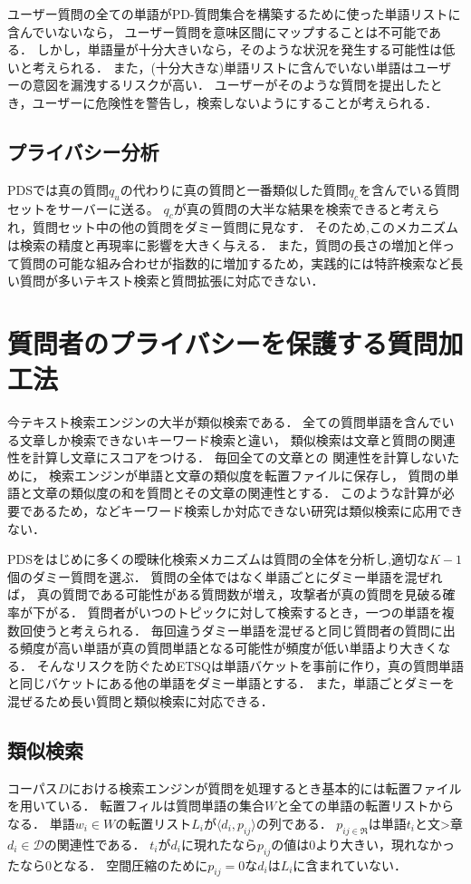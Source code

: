 \documentclass[master]{suribt}
\theoremstyle{definition}
\begin{document}
 ユーザー質問の全ての単語がPD-質問集合を構築するために使った単語リストに含んでいないなら，
 ユーザー質問を意味区間にマップすることは不可能である．
 しかし，単語量が十分大きいなら，そのような状況を発生する可能性は低いと考えられる．
 また，(十分大きな)単語リストに含んでいない単語はユーザーの意図を漏洩するリスクが高い．
 ユーザーがそのような質問を提出したとき，ユーザーに危険性を警告し，検索しないようにすることが考えられる．

 \subsection{プライバシー分析}
 PDSでは真の質問$q_u$の代わりに真の質問と一番類似した質問$q_c$を含んでいる質問セットをサーバーに送る。
 $q_c$が真の質問の大半な結果を検索できると考えられ，質問セット中の他の質問をダミー質問に見なす．
 そのため,このメカニズムは検索の精度と再現率に影響を大きく与える．
 また，質問の長さの増加と伴って質問の可能な組み合わせが指数的に増加するため，実践的には特許検索など長い質問が多いテキスト検索と質問拡張に対応できない．

 \section{質問者のプライバシーを保護する質問加工法}
 今テキスト検索エンジンの大半が類似検索である．
 全ての質問単語を含んでいる文章しか検索できないキーワード検索と違い，
 類似検索は文章と質問の関連性を計算し文章にスコアをつける\cite{}．
 毎回全ての文章との 関連性を計算しないために，
 検索エンジンが単語と文章の類似度を転置ファイルに保存し，
 質問の単語と文章の類似度の和を質問とその文章の関連性とする．
 このような計算が必要であるため，\cite{}などキーワード検索しか対応できない研究は類似検索に応用できない．

 PDSをはじめに多くの曖昧化検索メカニズム\cite{}は質問の全体を分析し,適切な$K−1$個のダミー質問を選ぶ．
 質問の全体ではなく単語ごとにダミー単語を混ぜれば，
 真の質問である可能性がある質問数が増え，攻撃者が真の質問を見破る確率が下がる．
 質問者がいつのトピックに対して検索するとき，一つの単語を複数回使うと考えられる．
 毎回違うダミー単語を混ぜると同じ質問者の質問に出る頻度が高い単語が真の質問単語となる可能性が頻度が低い単語より大きくなる．
 そんなリスクを防ぐためETSQは単語バケットを事前に作り，真の質問単語と同じバケットにある他の単語をダミー単語とする．
 また，単語ごとダミーを混ぜるため長い質問と類似検索に対応できる．

 \subsection{類似検索}
 コーパス$D$における検索エンジンが質問を処理するとき基本的には転置ファイルを用いている．
 転置フィルは質問単語の集合$W$と全ての単語の転置リストからなる．
 単語$w_i \in W$の転置リスト$L_i$が$\langle d_i,p_{ij}\rangle$の列である．
 $p_{ij \in \Re}$は単語$t_i$と文>章$d_i \in \mathcal{D}$の関連性である．
 $t_i$が$d_i$に現れたなら$p_{ij}$の値は$0$より大きい，現れなかったなら$0$となる．
 空間圧縮のために$p_{ij}=0$な$d_i$は$L_i$に含まれていない．
\end{document}
